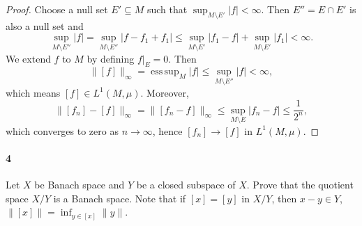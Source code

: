 \documentclass[12pt]{article}
\newlength{\myparskip}
\newenvironment{fullbox}{\begin{lrbox}{\savefullbox}\begin{minipage}{\dimexpr\textwidth-2\fboxsep\relax}\setlength{\parskip}{\myparskip}}{\end{minipage}\end{lrbox}\framebox[\textwidth]{\usebox{\savefullbox}}}
\newenvironment{pbox}[1][]{\begin{fullbox}\ifx#1\empty\else\paragraph{#1}\phantom{}\fi}{\end{fullbox}}
\theoremstyle{definition}
\newcommand{\<}{\langle}
\renewcommand{\>}{\rangle}
\newcommand{\seq}{\subseteq}
\newcommand{\esssup}{\operatorname{ess\,sup}}
\begin{document}
\begin{proof}
    Choose a null set $E' \seq M$ such that $\sup_{M \setminus E'}|f| < \infty$.
    Then $E'' = E \cap E'$ is also a null set and
    \[
        \sup_{M \setminus E''} |f|
            = \sup_{M \setminus E''} |f - f_1 + f_1|
            \leq \sup_{M \setminus E'} |f_1 - f| + \sup_{M \setminus E'} |f_1|
            < \infty.
    \]
    We extend $f$ to $M$ by defining $f|_E = 0$.
    Then
    \[
        \|[f]\|_\infty = \esssup_M |f| \leq \sup_{M \setminus E''} |f| < \infty,
    \]
    which means $[f] \in L^1(M, \mu)$.
    Moreover,
    \[
        \|[f_n] - [f]\|_\infty
            = \|[f_n - f]\|_\infty
            \leq \sup_{M \setminus E} |f_n - f| \leq \frac{1}{2^n},
    \]
    which converges to zero as $n \to \infty$, hence $[f_n] \to [f]$ in $L^1(M, \mu)$.
\end{proof}


\newpage
\begin{pbox}[4]
    Let $X$ be Banach space and $Y$ be a closed subspace of $X$.
    Prove that the quotient space $X/Y$ is a Banach space.
    Note that if $[x] = [y]$ in $X/Y$, then $x - y \in Y$, $\|[x]\| = \inf_{y \in [x]} \|y\|$.
\end{pbox}
\end{document}
